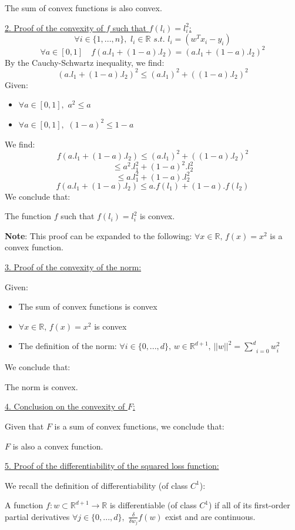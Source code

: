 \documentclass{homework}
\begin{document}
\textcolor{OliveGreen}{The sum of convex functions is also convex.}

\underline{2. Proof of the convexity of $f$ such that $f(l_i)=l_i^2$:}
$$\forall i \in \{1, ..., n\},\,\, l_i\in\mathbb{R}\,\,{s.t.}\,\, l_i = (w^Tx_i - y_i)$$
$$\forall a\in[0,1]\quad f(a.l_1+(1-a).l_2) = (a.l_1 + (1-a).l_2)^2$$
By the Cauchy-Schwartz inequality, we find:
$$(a.l_1 + (1-a).l_2)^2\le(a.l_1)^2+((1-a).l_2)^2$$
Given:
\begin{itemize}
    \item $\forall a\in[0,1],\,\, a^2\le a$
    \item $\forall a\in[0,1],\,\, (1-a)^2\le1-a$
\end{itemize}
We find:
$$f(a.l_1+(1-a).l_2) \le (a.l_1)^2+((1-a).l_2)^2$$
$$\le a^2.l_1^2+(1-a)^2.l_2^2$$
$$\le a.l_1^2+(1-a).l_2^2$$
$$f(a.l_1+(1-a).l_2) \le a.f(l_1)+(1-a).f(l_2)$$
We conclude that: 

\textcolor{OliveGreen}{The function $f$ such that $f(l_i)=l_i^2$ is convex.}

\textbf{Note}: This proof can be expanded to the following: $\forall x \in \mathbb{R},\, f(x)=x^2$ is 
a convex function.

\underline{3. Proof of the convexity of the norm:}

Given:
\begin{itemize}
    \item The sum of convex functions is convex
    \item $\forall x\in\mathbb{R},\,f(x)=x^2$ is convex
    \item The definition of the norm: $\forall i \in \{0,...,d\},\, w\in\mathbb{R}^{d+1}
    ,\, ||w||^2=\underset{i=0}{\overset{d}{\sum}}w_i^2$
\end{itemize}
We conclude that: 

\textcolor{OliveGreen}{The norm is convex.}

\underline{4. Conclusion on the convexity of $F$:}

Given that $F$ is a sum of convex functions, we conclude that: 

\textcolor{OliveGreen}{$F$ is also a convex function.}

\underline{5. Proof of the differentiability of the squared loss function:}

We recall the definition of differentiability (of class $C^1$): 

A function $f:w\subset\mathbb{R}^{d+1}\rightarrow\mathbb{R}$ is differentiable (of class $C^1$) if all of its 
first-order partial derivatives $\forall j\in\{0,...,d\},\,\,\frac{\delta}{\delta w_j}f(w)$
exist and are continuous.
\end{document}
